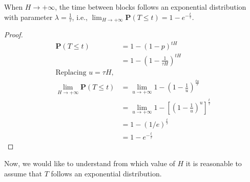 \begin{theorem}
	When $H \rightarrow +\infty$, the time between blocks follows an exponential distribution with parameter $\lambda = \frac{1}{\tau}$, i.e., $\lim_{H \rightarrow +\infty} \mathbf{P}(T \leq t) = 1 - e^{-\frac{t}{\tau}}$.
\end{theorem}
\begin{proof}
\begin{align*}
	\mathbf{P}(T \leq t) &= 1 - (1-p)^{tH} \\
		     &= 1 - \left( 1 - \frac{1}{\tau H} \right)^{tH} \\
	\text{Replacing $u = \tau H$,} \\
	\lim_{H \rightarrow +\infty} \mathbf{P}(T \leq t) &= \lim_{u \rightarrow +\infty} 1 - \left( 1 - \frac{1}{u} \right)^{\frac{tu}{\tau}} \\
				&= \lim_{u \rightarrow +\infty} 1 - \left[ \left( 1 - \frac{1}{u} \right)^{u} \right]^{\frac{t}{\tau}} \\
				&= 1 - \left( 1/e \right)^{\frac{t}{\tau}} \\
				&= 1 - e^{-\frac{t}{\tau}}
\end{align*}
\end{proof}

Now, we would like to understand from which value of $H$ it is reasonable to assume that $T$ follows an exponential distribution.

